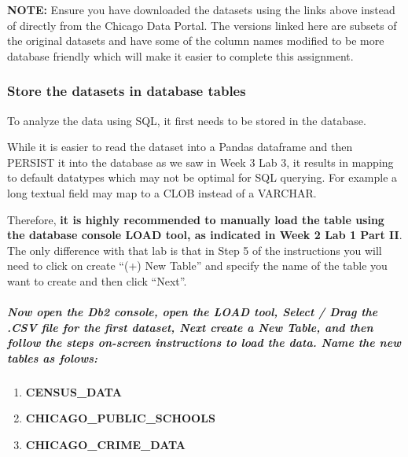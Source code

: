 \documentclass[11pt]{article}
\providecommand{\tightlist}{%
      \setlength{\itemsep}{0pt}\setlength{\parskip}{0pt}}
\begin{document}
\textbf{NOTE:} Ensure you have downloaded the datasets using the links
above instead of directly from the Chicago Data Portal. The versions
linked here are subsets of the original datasets and have some of the
column names modified to be more database friendly which will make it
easier to complete this assignment.

    \hypertarget{store-the-datasets-in-database-tables}{%
\subsubsection{Store the datasets in database
tables}\label{store-the-datasets-in-database-tables}}

To analyze the data using SQL, it first needs to be stored in the
database.

While it is easier to read the dataset into a Pandas dataframe and then
PERSIST it into the database as we saw in Week 3 Lab 3, it results in
mapping to default datatypes which may not be optimal for SQL querying.
For example a long textual field may map to a CLOB instead of a VARCHAR.

Therefore, \textbf{it is highly recommended to manually load the table
using the database console LOAD tool, as indicated in Week 2 Lab 1 Part
II}. The only difference with that lab is that in Step 5 of the
instructions you will need to click on create ``(+) New Table'' and
specify the name of the table you want to create and then click
``Next''.

\hypertarget{now-open-the-db2-console-open-the-load-tool-select-drag-the-.csv-file-for-the-first-dataset-next-create-a-new-table-and-then-follow-the-steps-on-screen-instructions-to-load-the-data.-name-the-new-tables-as-folows}{%
\subparagraph{Now open the Db2 console, open the LOAD tool, Select /
Drag the .CSV file for the first dataset, Next create a New Table, and
then follow the steps on-screen instructions to load the data. Name the
new tables as
folows:}\label{now-open-the-db2-console-open-the-load-tool-select-drag-the-.csv-file-for-the-first-dataset-next-create-a-new-table-and-then-follow-the-steps-on-screen-instructions-to-load-the-data.-name-the-new-tables-as-folows}}

\begin{enumerate}
\def\labelenumi{\arabic{enumi}.}
\tightlist
\item
  \textbf{CENSUS\_DATA}
\item
  \textbf{CHICAGO\_PUBLIC\_SCHOOLS}
\item
  \textbf{CHICAGO\_CRIME\_DATA}
\end{enumerate}
\end{document}
